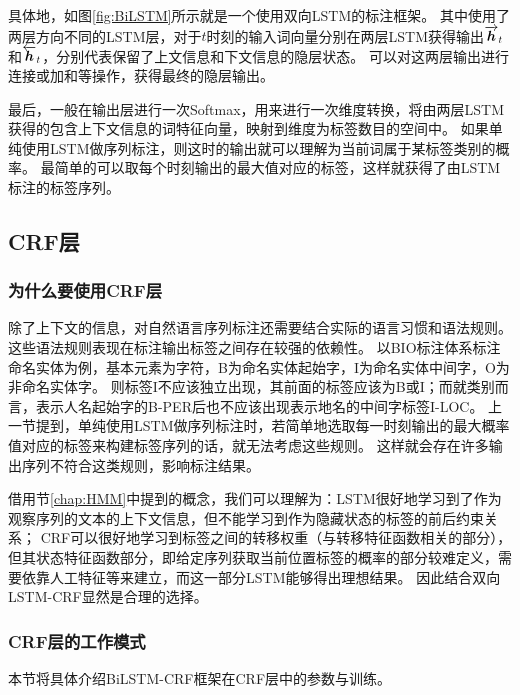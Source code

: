 具体地，如图\ref{fig:BiLSTM}所示就是一个使用双向LSTM的标注框架。
其中使用了两层方向不同的LSTM层，对于$t$时刻的输入词向量分别在两层LSTM获得输出$\overrightarrow{\boldsymbol{h}}_t$和$\overleftarrow{\boldsymbol{h}}_t$，分别代表保留了上文信息和下文信息的隐层状态。
可以对这两层输出进行连接或加和等操作，获得最终的隐层输出。

最后，一般在输出层进行一次Softmax，用来进行一次维度转换，将由两层LSTM获得的包含上下文信息的词特征向量，映射到维度为标签数目的空间中。
如果单纯使用LSTM做序列标注，则这时的输出就可以理解为当前词属于某标签类别的概率。
最简单的可以取每个时刻输出的最大值对应的标签，这样就获得了由LSTM标注的标签序列。
\subsection{CRF层}
\subsubsection{为什么要使用CRF层}
除了上下文的信息，对自然语言序列标注还需要结合实际的语言习惯和语法规则。
这些语法规则表现在标注输出标签之间存在较强的依赖性。
以BIO标注体系标注命名实体为例，基本元素为字符，B为命名实体起始字，I为命名实体中间字，O为非命名实体字。
则标签I不应该独立出现，其前面的标签应该为B或I；而就类别而言，表示人名起始字的B-PER后也不应该出现表示地名的中间字标签I-LOC。
上一节提到，单纯使用LSTM做序列标注时，若简单地选取每一时刻输出的最大概率值对应的标签来构建标签序列的话，就无法考虑这些规则。
这样就会存在许多输出序列不符合这类规则，影响标注结果。

借用节\ref{chap:HMM}中提到的概念，我们可以理解为：LSTM很好地学习到了作为观察序列的文本的上下文信息，但不能学习到作为隐藏状态的标签的前后约束关系；
CRF可以很好地学习到标签之间的转移权重（与转移特征函数相关的部分），但其状态特征函数部分，即给定序列获取当前位置标签的概率的部分较难定义，需要依靠人工特征等来建立，而这一部分LSTM能够得出理想结果。
因此结合双向LSTM-CRF显然是合理的选择。
\subsubsection{CRF层的工作模式}
本节将具体介绍BiLSTM-CRF框架在CRF层中的参数与训练。

